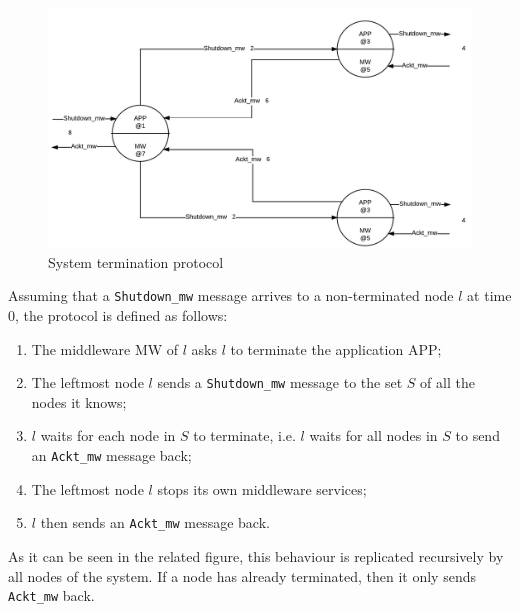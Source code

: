 \begin{figure}[H]
  \centering
  \includegraphics[width=\columnwidth]{sections/images/solution/termination.pdf}
  \caption{System termination protocol}
  \label{fig:sys-termination-protocol}
\end{figure}

Assuming that a \texttt{Shutdown\_mw} message arrives to a non-terminated node
$l$ at time 0, the protocol is defined as follows:

\begin{enumerate}
  \item The middleware MW of $l$ asks $l$ to terminate the application APP;
  \item The leftmost node $l$ sends a \texttt{Shutdown\_mw} message to the set
    $S$ of all the nodes it knows;
  \item $l$ waits for each node in $S$ to terminate, i.e. $l$ waits for all
    nodes in $S$ to send an \texttt{Ackt\_mw} message back;
  \item The leftmost node $l$ stops its own middleware services;
  \item $l$ then sends an \texttt{Ackt\_mw} message back.
\end{enumerate}

As it can be seen in the related figure, this behaviour is replicated
recursively by all nodes of the system. If a node has already terminated, then
it only sends \texttt{Ackt\_mw} back.
